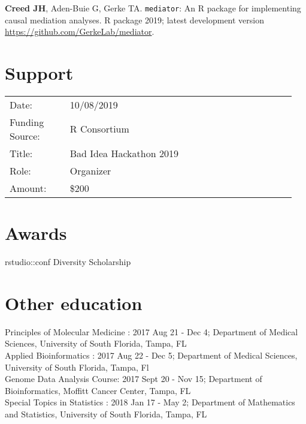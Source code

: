 \documentclass[11pt, a4paper]{article} %
\newcommand{\years}[1]{\marginnote{\scriptsize \raise .3ex\hbox{#1}}} %
\begin{document}
{\bf Creed JH}, Aden-Buie G, Gerke TA. \verb|mediator|: An R package for implementing causal mediation analyses. R package 2019; latest development version \href{https://github.com/GerkeLab/mediator}{https://github.com/GerkeLab/mediator}. 

\section*{Support}

\begin{longtable}{@{}p{0.2\linewidth} p{0.75\linewidth}}
Date: & 10/08/2019 \\
Funding Source: &  R Consortium \\
Title: & Bad Idea Hackathon 2019 \\
Role: & Organizer \\
Amount: & \$200 \\
\end{longtable}

\section*{Awards}

\years{2018} rstudio::conf Diversity Scholarship 


\section*{Other education}

Principles of Molecular Medicine : 2017 Aug 21 - Dec 4; Department of Medical Sciences, University of South Florida, Tampa, FL\\

Applied Bioinformatics : 2017 Aug 22 - Dec 5; Department of Medical Sciences, University of South Florida, Tampa, Fl \\

Genome Data Analysis Course:  2017 Sept 20 - Nov 15; Department of Bioinformatics, Moffitt Cancer Center, Tampa, FL \\

Special Topics in Statistics :  2018 Jan 17 -  May 2; Department of Mathematics and Statistics, University of South Florida, Tampa, FL





\end{document}

